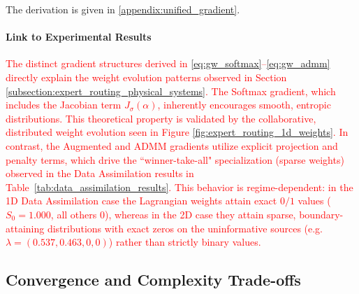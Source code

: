 \documentclass[preprint,12pt,authoryear]{elsarticle}
\begin{document}
The derivation is given in \ref{appendix:unified_gradient}.

\paragraph{Link to Experimental Results}
\textcolor{red}{The distinct gradient structures derived in \eqref{eq:gw_softmax}--\eqref{eq:gw_admm} directly explain the weight evolution patterns observed in Section \ref{subsection:expert_routing_physical_systems}. The Softmax gradient, which includes the Jacobian term $J_\sigma(\alpha)$, inherently encourages smooth, entropic distributions. This theoretical property is validated by the collaborative, distributed weight evolution seen in Figure \ref{fig:expert_routing_1d_weights}. In contrast, the Augmented and ADMM gradients utilize explicit projection and penalty terms, which drive the ``winner-take-all" specialization (sparse weights) observed in the Data Assimilation results in Table~\ref{tab:data_assimilation_results}. This behavior is regime-dependent: in the 1D Data Assimilation case the Lagrangian weights attain exact $0/1$ values ($S_0 = 1.000$, all others $0$), whereas in the 2D case they attain sparse, boundary-attaining distributions with exact zeros on the uninformative sources (e.g.\ $\lambda = (0.537, 0.463, 0, 0)$) rather than strictly binary values.}

\subsection{Convergence and Complexity Trade-offs}
\end{document}
